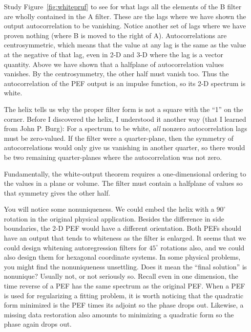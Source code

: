 \par
Study Figure~\ref{fig:whitepruf} to see for what lags
all the elements of the B filter are wholly contained in the A filter.
These are the lags
where we have shown the output autocorrelation to be vanishing.
Notice another set of lags where we have proven nothing
(where B is moved to the right of A).
Autocorrelations are centrosymmetric,
which means that the value at any lag
is the same as the value at the negative of that lag,
even in 2-D and 3-D where the lag is a vector quantity.
Above we have shown that a halfplane of autocorrelation values vanishes.
By the centrosymmetry, the other half must vanish too.
Thus the autocorrelation of the PEF output is an impulse function,
so its 2-D spectrum is white.

\par
The helix tells us why the proper filter form
is not a square with the ``1'' on the corner.
Before I discovered the helix, I understood it another way
(that I learned from John P. Burg):
For a spectrum to be white,
{\it all}
nonzero autocorrelation lags must be zero-valued.
If the filter were a quarter-plane,
then the symmetry of autocorrelations
would only give us vanishing in another quarter,
so there would be two remaining quarter-planes
where the autocorrelation was not zero.

\par
Fundamentally,
the white-output theorem requires a
one-dimensional ordering to the values in a plane or volume.
The filter must contain a halfplane of values
so that symmetry gives the other half.

\par
You will notice some nonuniqueness.
We could embed the helix
with a $90^\circ$ rotation
in the original physical application.
Besides the difference in side boundaries,
the 2-D PEF would have a different orientation.
Both PEFs should have an output that tends to whiteness as
the filter is enlarged.
It seems that we could design whitening autoregression filters
for $45^\circ$ rotations also,
and we could also design them for hexagonal coordinate systems.
In some physical problems,
you might find the nonuniqueness unsettling.
Does it mean the ``final solution'' is nonunique?
Usually not, or not seriously so.
Recall even in one dimension, the time reverse of a PEF
has the same spectrum as the original PEF.
When a PEF is used for regularizing a fitting problem,
it is worth noticing that the quadratic form minimized
is the PEF times its adjoint so the phase drops out.
Likewise, a missing data restoration also amounts to minimizing
a quadratic form so the phase again drops out.

